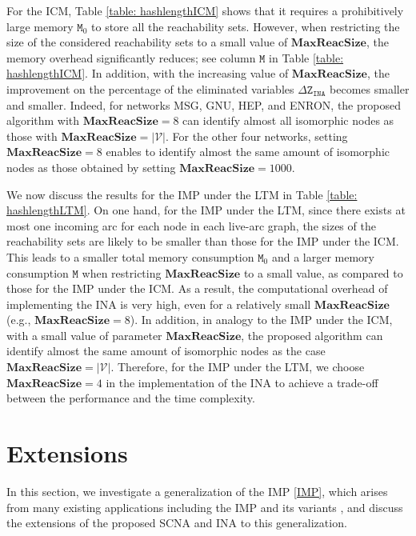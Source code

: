 \documentclass[a4paper,10pt]{article}
\newcommand{\maxlength}{\mathbf{MaxReacSize}}
\newcommand{\V}{\mathcal{V}}
\theoremstyle{plain}
\newcommand{\revv}[1]{{#1}}
\newcommand{\DeltaZINA}{{\Delta\texttt{Z}_\texttt{INA}}}
\newcommand{\Mem}{{\texttt{M}}}
\begin{document}
For the ICM, Table \ref{table: hashlengthICM} shows that it requires a prohibitively large memory $\Mem_0$ to store all the reachability sets.
%
However, when restricting the size of the considered reachability sets to a small value of $\maxlength$,
the memory overhead significantly reduces; see column $\Mem$ in Table \ref{table: hashlengthICM}.
In addition, with the increasing value of $\maxlength$, the improvement on the percentage of the eliminated variables $\DeltaZINA$ becomes smaller and smaller.
%
Indeed, for networks MSG, GNU, HEP, and ENRON, the proposed algorithm with $\maxlength = 8$ can identify almost all isomorphic nodes as those with $\maxlength = |\V|$.
For the other four networks, setting $\maxlength = 8$ enables to identify almost the same amount of isomorphic nodes as those obtained by setting $\maxlength=1000$.
%

We now discuss the results for the IMP under the LTM in Table \ref{table: hashlengthLTM}.
%
On one hand, for the IMP under the LTM, since there exists at most one incoming arc for each node in each live-arc graph, the sizes of the reachability sets are likely to be smaller than those for the IMP under the ICM.
This leads to a smaller total memory consumption $\Mem_0$ and a larger memory consumption $\Mem$ when restricting $\maxlength$ to a small value, as compared to those for the IMP under the ICM.
%
As a result, the computational overhead of implementing the INA is very high, even for a relatively small $\maxlength$ (e.g., $\maxlength=8$).
%
In addition, in analogy to the IMP under the ICM, with a small value of parameter $\maxlength$, the proposed algorithm can identify almost the same amount of isomorphic nodes as the case $\maxlength=|\V|$.
Therefore, for the IMP under the LTM, we choose $\maxlength=4$ in the implementation of the INA to achieve a trade-off between the performance and the time complexity.	


	\section{Extensions}\label{sect: EGP}
	
	In this section, we investigate a generalization of the IMP \eqref{IMP}, which arises from many existing applications including the IMP and its variants \cite{Long2011,nguyen2013budgeted,Wu2019,Zhang2014}, and discuss \revv{the extensions of the proposed SCNA and INA to this generalization}.
	
\end{document}
